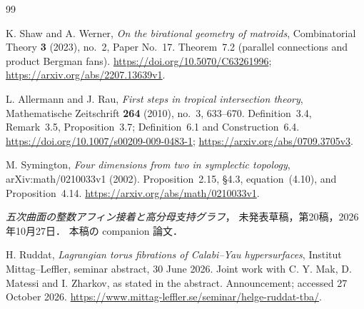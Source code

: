 \begin{thebibliography}{99}

K. Shaw and A. Werner,
\emph{On the birational geometry of matroids},
Combinatorial Theory \textbf{3} (2023), no.~2, Paper No.~17.
Theorem~7.2 (parallel connections and product Bergman fans).
\url{https://doi.org/10.5070/C63261996};
\url{https://arxiv.org/abs/2207.13639v1}.

L. Allermann and J. Rau,
\emph{First steps in tropical intersection theory},
Mathematische Zeitschrift \textbf{264} (2010), no.~3, 633--670.
Definition~3.4, Remark~3.5, Proposition~3.7;
Definition~6.1 and Construction~6.4.
\url{https://doi.org/10.1007/s00209-009-0483-1};
\url{https://arxiv.org/abs/0709.3705v3}.

M. Symington,
\emph{Four dimensions from two in symplectic topology},
arXiv:math/0210033v1 (2002).
Proposition~2.15, \S4.3, equation~(4.10), and Proposition~4.14.
\url{https://arxiv.org/abs/math/0210033v1}.

\emph{五次曲面の整数アフィン接着と高分母支持グラフ}，
未発表草稿，第20稿，2026年10月27日．
本稿の companion 論文．


H. Ruddat,
\emph{Lagrangian torus fibrations of Calabi--Yau hypersurfaces},
Institut Mittag--Leffler, seminar abstract, 30 June 2026.
Joint work with C. Y. Mak, D. Matessi and I. Zharkov, as stated in the abstract.
Announcement; accessed 27 October 2026.
\url{https://www.mittag-leffler.se/seminar/helge-ruddat-tba/}.

\end{thebibliography}
